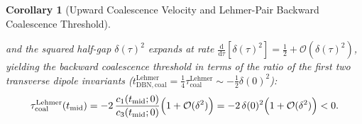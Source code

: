 \documentclass[11pt,reqno]{amsart}
\newtheorem{corollary}[theorem]{Corollary}
\theoremstyle{definition}
\theoremstyle{remark}
\numberwithin{equation}{section}
\newcommand{\dd}{\mathrm{d}}
\begin{document}
\begin{corollary}[Upward Coalescence Velocity and Lehmer-Pair Backward Coalescence Threshold]
\begin{enumerate}[label=\textup{(\roman*)},leftmargin=2.2em]
\begin{equation}
\end{equation}
and the squared half-gap $\delta(\tau)^2$ expands at rate $\frac{\dd}{\dd\tau}[\delta(\tau)^2] = \frac{1}{2} + \mathcal{O}(\delta(\tau)^2)$, yielding the backward coalescence threshold in terms of the ratio of the first two transverse dipole invariants ($t_{\mathrm{DBN,coal}}^{\mathrm{Lehmer}} = \frac{1}{4}\tau_{\mathrm{coal}}^{\mathrm{Lehmer}} \sim -\frac{1}{2}\delta(0)^2$):
\begin{equation}\label{eq:lehmer_coalescence_ratio}
\tau_{\mathrm{coal}}^{\mathrm{Lehmer}}(t_{\mathrm{mid}}) = -2\,\frac{c_1(t_{\mathrm{mid}};0)}{c_3(t_{\mathrm{mid}};0)}\Bigl(1 + \mathcal{O}(\delta^2)\Bigr) = -2\,\delta(0)^2\Bigl(1 + \mathcal{O}(\delta^2)\Bigr) < 0.
\end{equation}
\end{enumerate}
\end{corollary}
\end{document}
